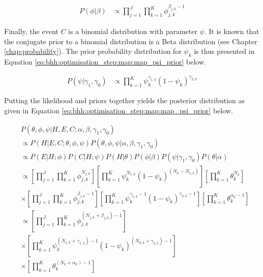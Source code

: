 \begin{equation}
      \label{eq:bhh:optimisation_step:map:map_phi_prior}
      \begin{split}
            P(\phi \vert \beta)
            &\propto \prod_{j=1}^{J}  \prod_{k=1}^{K} \phi_{j,k}^{\beta_{j,k} -1}
      \end{split}
\end{equation}

Finally, the event $C$ is a binomial distribution with parameter $\psi$. It is known that the conjugate prior to a binomial distribution is a Beta distribution (see Chapter \ref{chap:probability}). The prior probability distribution for $\psi_{k}$ is thus presented in Equation \ref{eq:bhh:optimisation_step:map:map_psi_prior} below.

\begin{equation}
      \label{eq:bhh:optimisation_step:map:map_psi_prior}
      \begin{split}
            P(\psi | \gamma_{1}, \gamma_{0})
            &\propto \prod_{k=1}^{K} \psi_{k}^{\gamma_{1,k}} (1- \psi_{k})^{\gamma_{2,k}}
      \end{split}
\end{equation}

Putting the likelihood and priors together yields the posterior distribution as given in Equation \ref{eq:bhh:optimisation_step:map:map_psi_prior} below.

\begin{equation}
      \label{eq:bhh:optimisation_step:map:posterior}
      \begin{split}
            & P(\theta, \phi, \psi \vert H, E, C;  \alpha, \beta, \gamma_{1}, \gamma_{0}) \\
            &\propto P(H \vert E, C; \theta, \phi, \psi)P(\theta, \phi, \psi \vert \alpha, \beta, \gamma_{1}, \gamma_{0}) \\
            &\propto P(E \vert H; \phi) P(C \vert H; \psi) P(H \vert \theta) P(\phi \vert \beta) P(\psi \vert \gamma_{1}, \gamma_{0}) P(\theta \vert \alpha)  \\
            &\propto \left[ \prod_{j=1}^{J} \prod_{k=1}^{K} \phi_{j,k}^{N_{j,k}} \right] \left[ \prod_{k=1}^{K} \psi_{k}^{N_{1,k}} (1 - \psi_{k})^{(N_{k} - N_{1,k})} \right] \left[ \prod_{k=1}^{K} \theta_{k}^{N_{k}} \right] \\
            &\times \left[ \prod_{j=1}^{J} \prod_{k=1}^{K} \phi_{j,k}^{\beta_{j,k} - 1} \right] \left[ \prod_{k=1}^{K} \psi_{k}^{\gamma_{1,k} - 1} (1 - \psi_{k})^{\gamma_{2,k} - 1} \right] \left[ \prod_{k=1}^{K} \theta_{k}^{\alpha_{k} - 1} \right] \\
            &\propto \left[ \prod_{j=1}^{J} \prod_{k=1}^{K} \phi_{j,k}^{(N_{j,k} + \beta_{j,k}) - 1} \right] \\
            &\times \left[ \prod_{k=1}^{K} \psi_{k}^{(N_{1,k} + \gamma_{1,k}) - 1} (1 - \psi_{k})^{(N_{0,k} + \gamma_{2,k} )- 1} \right] \\
            &\times \left[ \prod_{k=1}^{K} \theta_{k}^{(N_{k} + \alpha_{k}) - 1} \right]
      \end{split}
\end{equation}

